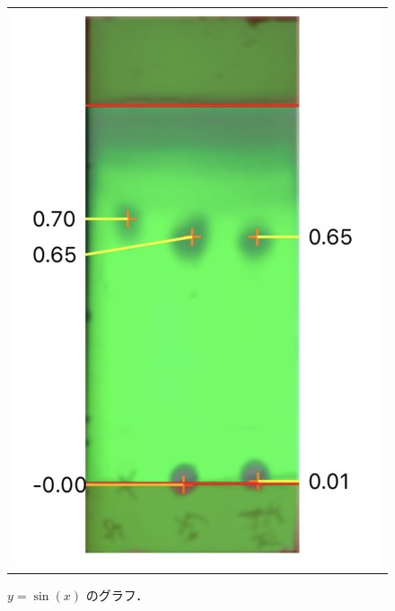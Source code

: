 \documentclass[a4paper,papersize,dvipdfmx]{jsarticle}
\begin{document}
\begin{figure}[htpb]
  \centering
    \begin{tabular}{c}
 
 
      \begin{minipage}{0.47\hsize}
        \centering
          \includegraphics[keepaspectratio, scale=0.60, angle=0]
                          {imgs6/tlc-u20.png}
                          \caption{$y=\sin(x)$ のグラフ．}
                          \label{fig:sin_x}
      \end{minipage}
 
 
      \begin{minipage}{0.06\hsize}
        \hspace{2mm}
      \end{minipage}
 

\end{tabular}
\end{figure}
\end{document}
